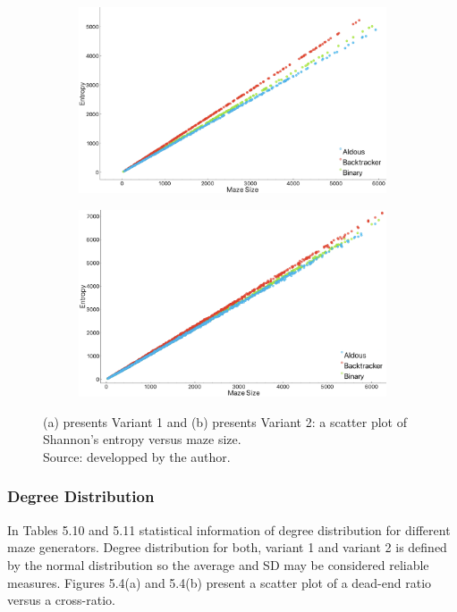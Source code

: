 \begin{figure}[!h]
    \centering
    \begin{subfigure}[!h]{0.7\textwidth}
       \includegraphics[width=0.9\linewidth]{entropy_variant1.png}
       \caption{}
    \end{subfigure}
    \begin{subfigure}[!h]{0.7\textwidth}
       \includegraphics[width=0.9\linewidth]{entropy_variant2.png}
       \caption{}
    \end{subfigure}
    \caption{(a) presents Variant 1 and (b) presents Variant 2: a scatter plot of Shannon's entropy versus maze size.\\Source: developped by the author.}
    \end{figure}%
 \newline   
\newpage
\subsubsection{Degree Distribution}  
In Tables 5.10 and 5.11 statistical information of degree distribution for different maze generators. Degree distribution for both, variant 1 and variant 2
is defined by the normal distribution so the average and SD may be considered reliable measures.
Figures 5.4(a) and 5.4(b) present a scatter plot of a dead-end ratio versus a cross-ratio.

